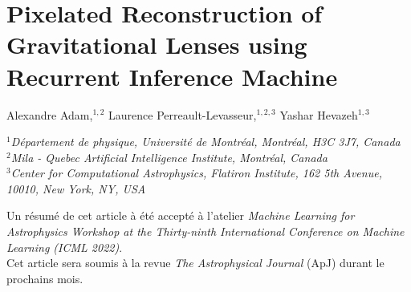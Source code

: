 
%

\chapter{Pixelated Reconstruction of Gravitational Lenses using Recurrent Inference Machine}\label{chap:censai}
\thispagestyle{empty}

\begin{center}
Alexandre Adam,$^{1,2}$
Laurence Perreault-Levasseur,$^{1,2,3}$
Yashar Hevazeh$^{1,3}$
\end{center}

\vspace*{0.5cm}
\noindent $^{1}$\textit{D\'{e}partement de physique, Universit\'{e} de Montr\'{e}al, Montr\'{e}al, H3C 3J7, Canada}\\
$^{2}$\textit{Mila - Quebec Artificial Intelligence Institute, Montréal, Canada}\\
$^{3}$\textit{Center for Computational Astrophysics, Flatiron Institute, 162 5th Avenue, 10010, New York, NY, USA}\\
\vspace*{1.5cm}

\begin{center}
Un résumé de cet article à été accepté à l'atelier \textit{Machine Learning for Astrophysics
Workshop at the Thirty-ninth International Conference on Machine Learning (ICML 2022)}. \\
Cet article sera soumis à la revue \textit{The Astrophysical Journal} (ApJ) durant le prochains mois. 
\end{center}


\clearpage
